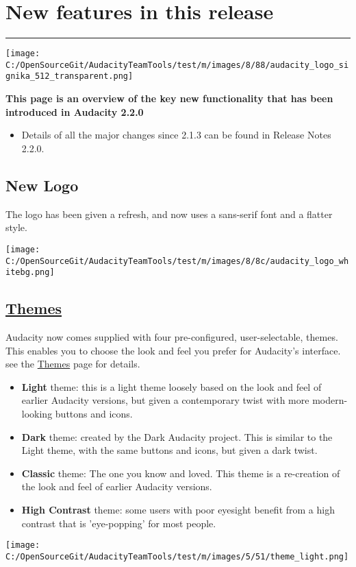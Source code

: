 
\ensurespace\section{New features in this release}
\par\vspace{1mm}\hrule
\begin{multicols}{2}\label{new:features:in:this:release:}
\par\texttt{[image: C:/OpenSourceGit/AudacityTeamTools/test/m/images/8/88/audacity\_logo\_signika\_512\_transparent.png]}\par
\textbf{This page is an overview of the key new functionality that has been introduced in Audacity 2.2.0}
\begin{itemize}
\item Details of all the major changes since 2.1.3 can be found in Release Notes 2.2.0.
\end{itemize}

\subsection{New Logo}
\label{new:features:in:this:release:logo}The logo has been given a refresh, and now uses a sans-serif font and a flatter style.

\par\texttt{[image: C:/OpenSourceGit/AudacityTeamTools/test/m/images/8/8c/audacity\_logo\_whitebg.png]}\par

\subsection{
\hyperref[\foo{themes:}]{Themes}
}
\label{new:features:in:this:release:themes}Audacity now comes supplied with four pre-configured, user-selectable, themes.  This enables you to choose the look and feel you prefer for Audacity's interface. see the 
\hyperref[\foo{themes:}]{Themes}
 page for details.

\begin{itemize}
\item \textbf{Light} theme: this is a light theme loosely based on the look and feel of earlier Audacity versions, but given a contemporary twist with more modern-looking buttons and icons. 
\item \textbf{Dark} theme: created by the Dark Audacity project. This is similar to the Light theme, with the same buttons and icons, but given a dark twist.
\item \textbf{Classic} theme: The one you know and loved. This theme is a re-creation of the look and feel of earlier Audacity versions. 
\item \textbf{High Contrast} theme: some users with poor eyesight benefit from a high contrast that is 'eye-popping' for most people.
\end{itemize}
\par 
\par\texttt{[image: C:/OpenSourceGit/AudacityTeamTools/test/m/images/5/51/theme\_light.png]}\par


\end{multicols}
